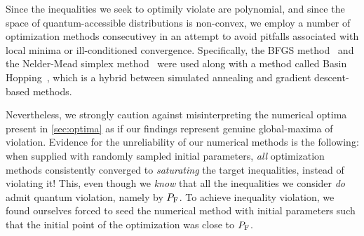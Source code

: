 \documentclass[aps, 10pt, english, twoside, pra, nofootinbib, tightenlines, longbibliography, superscriptaddress]{revtex4-1}
\begin{document}

    Since the inequalities we seek to optimily violate are polynomial, and since the space of quantum-accessible distributions is non-convex, we employ a number of optimization methods consecutivey in an attempt to avoid pitfalls associated with local minima or ill-conditioned convergence. Specifically, the BFGS method~\cite[p.142]{Nocedal_2000} and the Nelder-Mead simplex method~\cite[p.238]{Nocedal_2000} were used along with a method called Basin Hopping~\cite{Wales_1997}, which is a hybrid between simulated annealing and gradient descent-based methods.

    Nevertheless, we strongly caution against misinterpreting the numerical optima present in \cref{sec:optima} as if our findings represent genuine global-maxima of violation. Evidence for the unreliability of our numerical methods is the following: when supplied with randomly sampled initial parameters, \emph{all} optimization methods consistently converged to \emph{saturating} the target inequalities, instead of violating it! This, even though we \emph{know} that all the inequalities we consider \emph{do} admit quantum violation, namely by  $\prob[\fritz]$. To achieve inequality violation, we found ourselves forced to seed the numerical method with initial  parameters such that the initial point of the optimization was close to  $\prob[\fritz]$.
\end{document}
